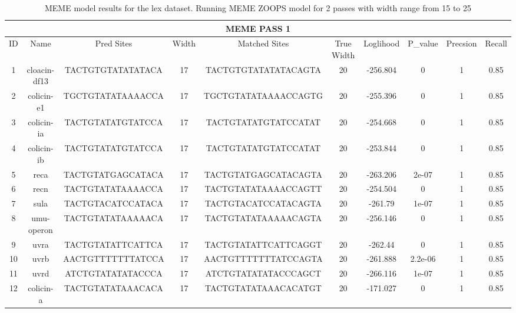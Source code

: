 \documentclass{article}
\begin{document}
\begin{table}
\setlength\tabcolsep{0.5pt} %
\footnotesize
  \caption{MEME model results for the lex dataset. Running MEME ZOOPS model for 2 passes with width range from 15 to 25}
  \label{sample2}
\centering
\begin{tabular}{c|c|c|c|c|c|c|c|c|c}
\multicolumn{10}{|c|}{\textbf{MEME PASS 1}}\\
   \hline
\toprule
 ID &     Name &         Pred Sites & Width &            Matched Sites & True Width &  Loglihood &   P\_value &  Precsion &  Recall \\
\midrule
 1 &  cloacin-df13 &  TACTGTGTATATATACA &    17 &  TACTGTGTATATATACAGTA &         20 &  -256.804 &        0 &        1 &   0.85 \\
  2 &    colicin-e1 &  TGCTGTATATAAAACCA &    17 &  TGCTGTATATAAAACCAGTG &         20 &  -255.396 &        0 &        1 &   0.85 \\
  3 &    colicin-ia &  TACTGTATATGTATCCA &    17 &  TACTGTATATGTATCCATAT &         20 &  -254.668 &        0 &        1 &   0.85 \\
  4 &    colicin-ib &  TACTGTATATGTATCCA &    17 &  TACTGTATATGTATCCATAT &         20 &  -253.844 &        0 &        1 &   0.85 \\
  5 &          reca &  TACTGTATGAGCATACA &    17 &  TACTGTATGAGCATACAGTA &         20 &  -263.206 &    2e-07 &        1 &   0.85 \\
  6 &          recn &  TACTGTATATAAAACCA &    17 &  TACTGTATATAAAACCAGTT &         20 &  -254.504 &        0 &        1 &   0.85 \\
  7 &          sula &  TACTGTACATCCATACA &    17 &  TACTGTACATCCATACAGTA &         20 &   -261.79 &    1e-07 &        1 &   0.85 \\
  8 &    umu-operon &  TACTGTATATAAAAACA &    17 &  TACTGTATATAAAAACAGTA &         20 &  -256.146 &        0 &        1 &   0.85 \\
  9 &          uvra &  TACTGTATATTCATTCA &    17 &  TACTGTATATTCATTCAGGT &         20 &   -262.44 &        0 &        1 &   0.85 \\
 10 &          uvrb &  AACTGTTTTTTTATCCA &    17 &  AACTGTTTTTTTATCCAGTA &         20 &  -261.888 &  2.2e-06 &        1 &   0.85 \\
 11 &          uvrd &  ATCTGTATATATACCCA &    17 &  ATCTGTATATATACCCAGCT &         20 &  -266.116 &    1e-07 &        1 &   0.85 \\
 12 &     colicin-a &  TACTGTATATAAACACA &    17 &  TACTGTATATAAACACATGT &         20 &  -171.027 &        0 &        1 &   0.85 \\

\end{tabular}
\end{table}
\end{document}
